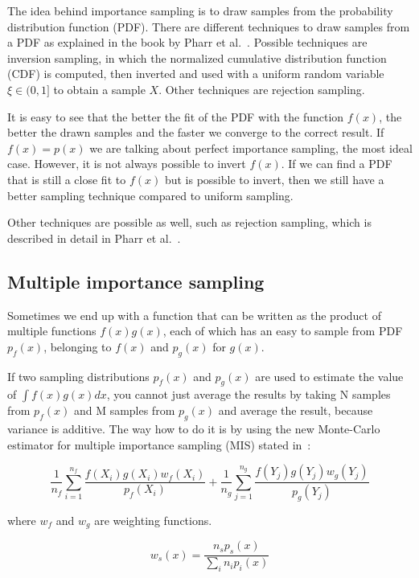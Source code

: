 \documentclass[11pt,a4paper]{report}
\begin{document}
The idea behind importance sampling is to draw samples from the probability distribution function (PDF). There are different techniques to draw samples from a PDF as explained in the book by Pharr et al.~\cite{pharr2017}. Possible techniques are inversion sampling, in which the normalized cumulative distribution function (CDF) is computed, then inverted and used with a uniform random variable $\xi \in (0, 1]$ to obtain a sample $X$. Other techniques are rejection sampling.
 
It is easy to see that the better the fit of the PDF with the function $f(x)$, the better the drawn samples and the faster we converge to the correct result. If $f(x) = p(x)$ we are talking about perfect importance sampling, the most ideal case. However, it is not always possible to invert $f(x)$. If we can find a PDF that is still a close fit to $f(x)$ but is possible to invert, then we still have a better sampling technique compared to uniform sampling.

Other techniques are possible as well, such as rejection sampling, which is described in detail in Pharr et al.~\cite{pharr2017}.

\subsection{Multiple importance sampling}

Sometimes we end up with a function that can be written as the product of multiple functions $f(x)g(x)$, each of which has an easy to sample from PDF $p_f(x)$, belonging to $f(x)$ and $p_g(x)$ for $g(x)$.

If two sampling distributions $p_f(x)$ and $p_g(x)$ are used to estimate the value of $\int f(x)g(x) dx$, you cannot just average the results by taking N samples from $p_f(x)$ and M samples from $p_g(x)$ and average the result, because variance is additive. The way how to do it is by using the new Monte-Carlo estimator for multiple importance sampling (MIS) stated in~\cite{pharr2017}: 

\begin{equation}
\frac{1}{n_f} \sum_{i=1}^{n_f} \frac{f(X_i)g(X_i) w_f(X_i)}{p_f(X_i)} + 
\frac{1}{n_g} \sum_{j=1}^{n_g} \frac{f(Y_j)g(Y_j) w_g(Y_j)}{p_g(Y_j)} 
\end{equation}

where $w_f$ and $w_g$ are weighting functions.

\begin{equation}
w_s(x) = \frac{n_sp_s(x)}{\sum_i n_i p_i(x)}
\end{equation}
\end{document}
